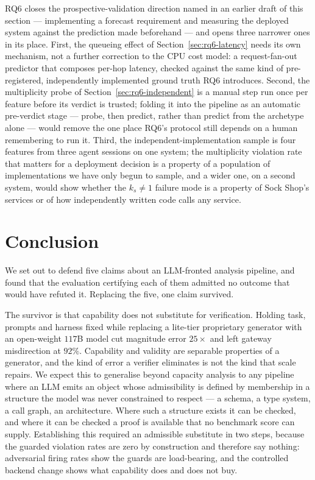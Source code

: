 \documentclass[journal, 10pt]{IEEEtran}
\begin{document}
RQ6 closes the prospective-validation direction named in an earlier draft of
this section --- implementing a forecast requirement and measuring the
deployed system against the prediction made beforehand --- and opens three
narrower ones in its place. First, the queueing effect of
Section~\ref{sec:rq6-latency} needs its own mechanism, not a further correction
to the CPU cost model: a request-fan-out predictor that composes per-hop
latency, checked against the same kind of pre-registered, independently
implemented ground truth RQ6 introduces. Second, the multiplicity probe of
Section~\ref{sec:rq6-independent} is a manual step run once per feature before
its verdict is trusted; folding it into the pipeline as an automatic
pre-verdict stage --- probe, then predict, rather than predict from the
archetype alone --- would remove the one place RQ6's protocol still depends on
a human remembering to run it. Third, the independent-implementation sample is
four features from three agent sessions on one system; the multiplicity
violation rate that matters for a deployment decision is a property of a
population of implementations we have only begun to sample, and a wider one,
on a second system, would show whether the $k_s\neq1$ failure mode is a
property of Sock Shop's services or of how independently written code calls
any service.


\section{Conclusion}
\label{sec:conclusion}
We set out to defend five claims about an LLM-fronted analysis pipeline, and
found that the evaluation certifying each of them admitted no outcome that would
have refuted it. Replacing the five, one claim survived.

The survivor is that capability does not substitute for verification. Holding
task, prompts and harness fixed while replacing a lite-tier proprietary generator
with an open-weight $117$B model cut magnitude error $25{\times}$ and left gateway
misdirection at $92\%$. Capability and validity are separable properties of a
generator, and the kind of error a verifier eliminates is not the kind that scale
repairs. We expect this to generalise beyond capacity analysis to any pipeline
where an LLM emits an object whose admissibility is defined by membership in a
structure the model was never constrained to respect --- a schema, a type system,
a call graph, an architecture. Where such a structure exists it can be checked,
and where it can be checked a proof is available that no benchmark score can
supply. Establishing this required an admissible substitute in two steps, because
the guarded violation rates are zero by construction and therefore say nothing:
adversarial firing rates show the guards are load-bearing, and the controlled
backend change shows what capability does and does not buy.
\end{document}
